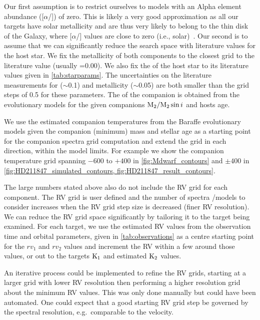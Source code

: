 Our first assumption is to restrict ourselves to models with an Alpha element abundance ([\(\alpha\)/]) of zero.
This is likely a very good approximation as all our targets have solar metallicity and are thus very likely to belong to the thin disk of the Galaxy, where [\(\alpha\)/] values are close to zero (i.e., solar)~\citet[e.g.]{adibekyan_chemical_2012}.
Our second is to assume that we can significantly reduce the search space with literature values for the host star.
We fix the metallicity of both components to the closest grid to the literature value (usually \feh{}=0.00).
We also fix the \logg{} of the host star to its literature values given in \cref{tab:starparams}.
The uncertainties on the literature measurements for \logg{} (\(\sim\)0.1) and metallicity (\(\sim\)0.05) are both smaller than the grid steps of 0.5 for these parameters.
The \logg{} of the companion is obtained from the~\citet{baraffe_evolutionary_2003,baraffe_new_2015} evolutionary models for the given companions \(\textrm{M}_{2}/\textrm{M}_{2}\sin{i}\) and hosts age.

We use the estimated companion temperatures from the Baraffe evolutionary models given the companion (minimum) mass and stellar age as a starting point for the companion spectra grid computation and extend the grid in each direction, within the model limits.
For example we show the companion temperature grid spanning \(-600\) to \(+400\)\K{} in \cref{fig:Mdwarf_contours} and \(\pm400\)\K{} in \cref{fig:HD211847_simulated_contours, fig:HD211847_result_contours}.

The large numbers stated above also do not include the {RV} grid for each component.
The {RV} grid is user defined and the number of spectra /models to consider increases when the {RV} grid step size is decreased (finer {RV} resolution).
We can reduce the {RV} grid space significantly by tailoring it to the target being examined.
For each target, we use the estimated {RV} values from the observation time and orbital parameters, given in \cref{tab:observations} as a centre starting point for the \({rv}_1\) and \({rv}_2\) values and increment the {RV} within a few {\fwhm} around those values, or out to the targets \(\rm K_1\) and estimated \(\rm K_2\) values.

An iterative process could be implemented to refine the {RV} grids, starting at a larger grid with lower {RV} resolution then performing a higher resolution grid about the minimum \textchisquared{} {RV} values.
This was only done manually but could have been automated.
One could expect that a good starting {RV} grid step be governed by the spectral resolution, e.g.\ comparable to the {\fwhm} velocity.

